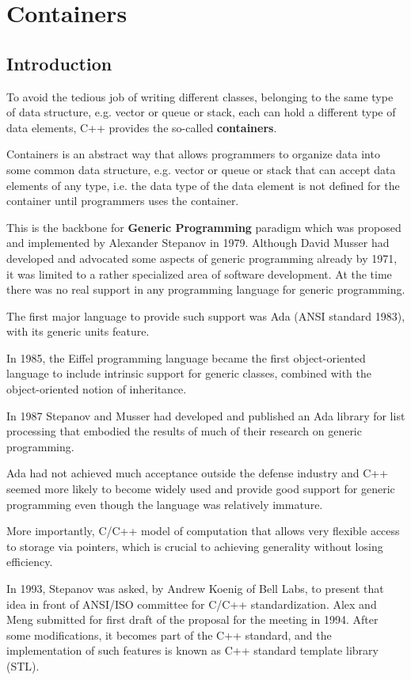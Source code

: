 \chapter{Containers}
\label{chap:C++_containers}
\label{chap:containers}

\section{Introduction}
\label{sec:containers}

To avoid the tedious job of writing different classes, belonging to the same
type of data structure, e.g. vector or queue or stack, each can hold a different
type of data elements, C++ provides the so-called {\bf containers}.


Containers is an abstract way that allows programmers to organize data into some
common data structure, e.g. vector or queue or stack that can accept data
elements of any type, i.e. the data type of the data element is not defined for
the container until programmers uses the container.

This is the backbone for {\bf Generic Programming} paradigm which was proposed
and implemented by Alexander Stepanov in 1979. Although David Musser had
developed and advocated some aspects of generic programming already by 1971, it
was limited to a rather specialized area of software development.
At the time there was no real support in any programming language for generic
programming.

\begin{mdframed}

The first major language to provide such support was Ada (ANSI standard 1983),
with its generic units feature.

In 1985, the Eiffel programming language became the first object-oriented
language to include intrinsic support for generic classes, combined with the
object-oriented notion of inheritance.
 
In 1987 Stepanov and Musser had developed and published an Ada library for list
processing that embodied the results of much of their research on generic
programming.

Ada had not achieved much acceptance outside the defense industry and C++ seemed
more likely to become widely used and provide good support for generic
programming even though the language was relatively immature.

More importantly, C/C++ model of computation that allows very flexible access to
storage via pointers, which is crucial to achieving generality without losing
efficiency.

In 1993, Stepanov was asked, by Andrew Koenig of Bell Labs, to present that idea
in front of ANSI/ISO committee for C/C++ standardization.
Alex and Meng submitted for first draft of the proposal for the meeting in 1994.
After some modifications, it becomes part of the C++ standard, and the
implementation of such features is known as C++ standard template library (STL).

\end{mdframed}

